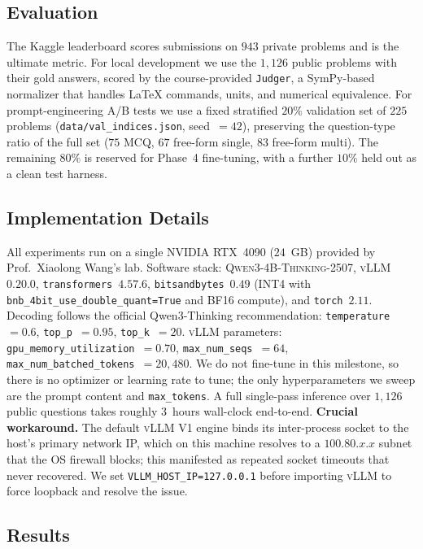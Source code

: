 \documentclass{article}
\begin{document}
\subsection{Evaluation}
\label{sec:evaluation}

The Kaggle leaderboard scores submissions on $943$ private problems
and is the ultimate metric. For local development we use the $1{,}126$
public problems with their gold answers, scored by the course-provided
\texttt{Judger}, a SymPy-based normalizer that handles LaTeX commands,
units, and numerical equivalence. For prompt-engineering A/B tests we
use a fixed stratified $20\%$ validation set of $225$ problems
(\texttt{data/val\_indices.json}, seed~$=42$), preserving the
question-type ratio of the full set ($75$ MCQ, $67$ free-form single,
$83$ free-form multi). The remaining $80\%$ is reserved for Phase~4
fine-tuning, with a further $10\%$ held out as a clean test harness.

\subsection{Implementation Details}
\label{sec:implementation_details}

All experiments run on a single NVIDIA RTX~4090 ($24$~GB) provided by
Prof.\ Xiaolong Wang's lab. Software stack:
\textsc{Qwen3-4B-Thinking-2507},
\textsc{vLLM}~$0.20.0$,
\texttt{transformers}~$4.57.6$,
\texttt{bitsandbytes}~$0.49$ (INT4 with
\texttt{bnb\_4bit\_use\_double\_quant=True} and BF16 compute), and
\texttt{torch}~$2.11$. Decoding follows the official Qwen3-Thinking
recommendation: \texttt{temperature}~$=0.6$, \texttt{top\_p}~$=0.95$,
\texttt{top\_k}~$=20$. \textsc{vLLM} parameters:
\texttt{gpu\_memory\_utilization}~$=0.70$,
\texttt{max\_num\_seqs}~$=64$,
\texttt{max\_num\_batched\_tokens}~$=20{,}480$. We do not fine-tune in
this milestone, so there is no optimizer or learning rate to tune;
the only hyperparameters we sweep are the prompt content and
\texttt{max\_tokens}. A full single-pass inference over $1{,}126$
public questions takes roughly $3$~hours wall-clock end-to-end.
\textbf{Crucial workaround.} The default \textsc{vLLM} V1 engine binds
its inter-process socket to the host's primary network IP, which on
this machine resolves to a $100.80.\mathit{x}.\mathit{x}$ subnet that
the OS firewall blocks; this manifested as repeated socket timeouts
that never recovered. We set \verb|VLLM_HOST_IP=127.0.0.1| before
importing \textsc{vLLM} to force loopback and resolve the issue.

\subsection{Results}
\label{sec:results}
\end{document}
